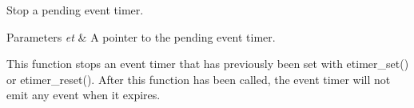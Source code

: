 Stop a pending event timer. 


\begin{DoxyParams}{Parameters}
{\em et} & A pointer to the pending event timer. \begin{DoxyVerb}        This function stops an event timer that has previously
        been set with etimer_set() or etimer_reset(). After
        this function has been called, the event timer will not
        emit any event when it expires.\end{DoxyVerb}
 \\
\hline
\end{DoxyParams}
